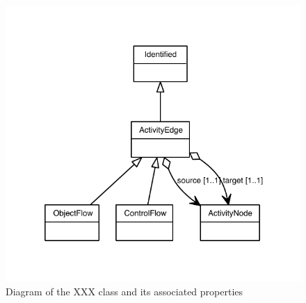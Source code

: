 \begin{figure}[ht]
\begin{center}
\includegraphics[scale=0.6]{uml_classes/ActivityEdge_abstraction_hierarchy.pdf}
\caption[]{Diagram of the XXX class and its associated properties}
\label{uml:ActivityEdge}
\end{center}
\end{figure}


